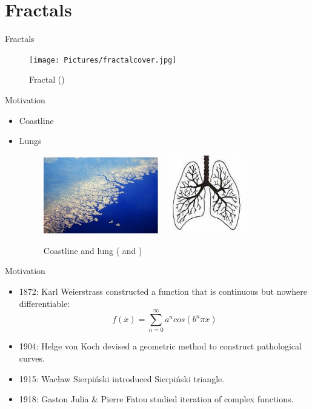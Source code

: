 \section{Fractals}

\begin{frame}{Fractals}
	\begin{figure}
		\centering
		\texttt{[image: Pictures/fractalcover.jpg]}
		\caption{Fractal (\cite{fractalcover})}
		\label{fig:enter-label}
	\end{figure}
	
\end{frame}

\begin{frame}{Motivation}
	\begin{itemize}
		\item Coastline
		\item Lungs
		\begin{figure}
			\centering
			\includegraphics[width = 5cm]{Pictures/coastline.jpg}
			\includegraphics[height = 3.4cm, width  = 4cm]{Pictures/lungs.jpg}
			\caption{Coastline and lung (\cite{COastline} and \cite{Lung})}
			\label{fig:enter-label}
		\end{figure}
		
	\end{itemize}
\end{frame}



\begin{frame}{Motivation}
	\begin{itemize}
		\item 1872: Karl Weierstrass constructed a function that is continuous but nowhere differentiable:
		$$f(x) = \sum\limits_{n=0}^{\infty}a^ncos(b^n\pi x)$$
	\end{itemize}
	\begin{itemize}
		\item 1904: Helge von Koch devised a geometric method to construct pathological curves.
	\end{itemize}
	\begin{itemize}
		\item 1915: Wacław Sierpiński introduced Sierpiński triangle.
	\end{itemize}
	\begin{itemize}
		\item 1918: Gaston Julia & Pierre Fatou studied iteration of complex functions.
	\end{itemize}
\end{frame}


